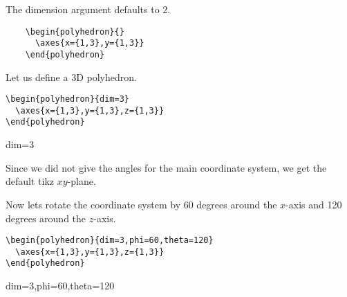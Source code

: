 \documentclass[a4paper]{article}
\begin{document}
The dimension argument defaults to $2$.


\begin{center}
  \begin{minipage}{0.6\textwidth}
  \begin{lstlisting}
    \begin{polyhedron}{}
      \axes{x={1,3},y={1,3}}
    \end{polyhedron}
  \end{lstlisting}
  \end{minipage}
  \qquad\qquad
  \begin{minipage}{0.2\textwidth}
    \begin{polyhedron}{}
    \end{polyhedron}
  \end{minipage}
\end{center}


Let us define a 3D polyhedron.

\begin{center}
  \begin{minipage}{0.6\textwidth}
  \begin{lstlisting}
\begin{polyhedron}{dim=3}
  \axes{x={1,3},y={1,3},z={1,3}}
\end{polyhedron}
  \end{lstlisting}
  \end{minipage}
  \qquad\qquad
  \begin{minipage}{0.2\textwidth}
    \begin{polyhedron}{dim=3}
    \end{polyhedron}
  \end{minipage}
\end{center}

Since we did not give the angles for the main coordinate system, we get the
default tikz $xy$-plane.

Now lets rotate the coordinate system by 60 degrees around the $x$-axis and
120 degrees around the $z$-axis.

\begin{center}
  \begin{minipage}{0.6\textwidth}
  \begin{lstlisting}
\begin{polyhedron}{dim=3,phi=60,theta=120}
  \axes{x={1,3},y={1,3},z={1,3}}
\end{polyhedron}
  \end{lstlisting}
  \end{minipage}
  \qquad\qquad
  \begin{minipage}{0.2\textwidth}
    \begin{polyhedron}{dim=3,phi=60,theta=120}
    \end{polyhedron}
  \end{minipage}
\end{center}
\end{document}
